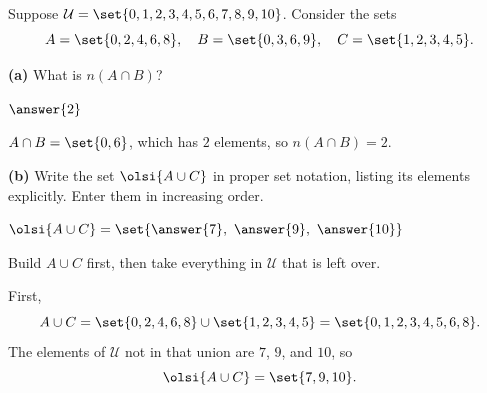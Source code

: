 \documentclass[12pt]{ximera}
\begin{document}
\begin{problem}
Suppose $\mathcal{U}=\set{0,1,2,3,4,5,6,7,8,9,10}$. Consider the sets
\[
A= \set{0,2,4,6,8},\quad B= \set{0,3,6,9},\quad C= \set{1,2,3,4,5}.
\]

\begin{prompt}
\textbf{(a)} What is $n(A \cap B)$?

$\answer{2}$

\begin{feedback}
$A\cap B=\set{0,6}$, which has $2$ elements, so $n(A\cap B)=2$.
\end{feedback}
\end{prompt}

\begin{prompt}
\textbf{(b)} Write the set $\olsi{A\cup C}$ in proper set notation, listing its
elements explicitly. Enter them in increasing order.

$\olsi{A\cup C}=\set{\answer{7},\ \answer{9},\ \answer{10}}$

\begin{hint}
Build $A\cup C$ first, then take everything in $\mathcal{U}$ that is left over.
\end{hint}

\begin{feedback}
First,
\[ A\cup C=\set{0,2,4,6,8}\cup\set{1,2,3,4,5}=\set{0,1,2,3,4,5,6,8}. \]
The elements of $\mathcal{U}$ not in that union are $7$, $9$, and $10$, so
\[ \olsi{A\cup C}=\set{7,9,10}. \]
\end{feedback}
\end{prompt}
\end{problem}
\end{document}
